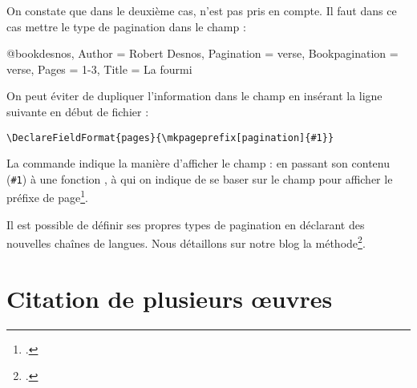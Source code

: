 
\begin{quotation}
\cite[2]{desnos}

\cite{desnos}
\end{quotation}


On constate que dans le deuxième cas,  n'est pas pris en compte.
Il faut dans ce cas mettre le type de pagination dans le champ  :

\begin{latexcode}
@book{desnos,
    Author = {Robert Desnos},
    Pagination = {verse},
    Bookpagination = {verse},
    Pages = {1-3},
    Title = {La fourmi}}
\end{latexcode}

\begin{quotation}
\cite[2]{desnos}

\cite{desnos}
\end{quotation}


\begin{plusloins}
On peut éviter de dupliquer l'information dans le champ  en insérant la ligne suivante en début de fichier  :

\begin{verbatim}
\DeclareFieldFormat{pages}{\mkpageprefix[pagination]{#1}}
\end{verbatim}

La commande  indique la manière d'afficher le champ  : en passant son contenu (\verb|#1|) à une fonction , à qui on indique de se baser sur le champ  pour afficher le préfixe de page\footcite[Voir][]{biblatex_formating}.
\end{plusloins}

\begin{plusloins}
Il est possible de définir ses propres types de pagination en déclarant des nouvelles chaînes de langues. Nous détaillons sur notre blog la méthode\footcite{biblio_pagination}.
\end{plusloins}

\section{Citation de plusieurs œuvres}\label{citemultiple}

